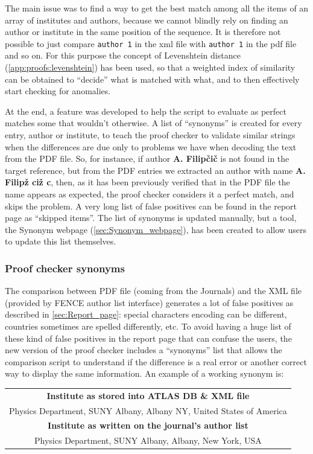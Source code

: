 The main issue was to find a way to get the best match among all the items of an array of institutes and authors,
because we cannot blindly rely on finding an author or institute in the same position of the sequence.
It is therefore not possible to just compare \texttt{author~1} in the xml file with \texttt{author~1} in the pdf file and so on.
For this purpose the concept of Levenshtein distance (\cref{app:proofs:levenshtein}) has been used,
so that a weighted index of similarity can be obtained to \enquote{decide} what is matched with what, and to then effectively start checking for anomalies.

At the end, a feature was developed to help the script to evaluate as perfect matches some that wouldn’t otherwise.
A list of \enquote{synonyms} is created for every entry, author or institute,
to teach the proof checker to validate similar strings when the differences are due only to problems we have when decoding the text from the PDF file.
So, for instance, if author \textbf{A. Filipčič} is not found in the target reference,
but from the PDF entries we extracted an author with name \textbf{A. Filipž ciž c}, then,
as it has been previously verified that in the PDF file the name appears as expected, the proof checker considers it a perfect match, and skips the problem.
A very long list of false positives can be found in the report page as \enquote{skipped items}.
The list of synonyms is updated manually, but a tool, the Synonym webpage (\cref{sec:Synonym_webpage}), has been created to allow users to update this list themselves.


\subsubsection{Proof checker synonyms}%
\label{sec:Proof_checker_synonyms}

The comparison between PDF file (coming from the Journals) and the XML file (provided by FENCE author list interface) generates a lot of false positives as described in \cref{sec:Report_page}:
special characters encoding can be different, countries sometimes are spelled differently, etc.
To avoid having a huge list of these kind of false positives in the report page that can confuse the users, the new version of the proof checker includes a \enquote{synonyms} list that allows the comparison script to understand if the difference is a real error or another correct way to display the same information.
An example of a working synonym is:
\begin{table}[htb]
  \centering
  \begin{tabular}{c}
  \textbf{Institute as stored into ATLAS DB \& XML file} \\
  Physics Department, SUNY Albany, Albany NY, United States of America \\
  \midrule
  \textbf{Institute as written on the journal’s author list} \\
  Physics Department, SUNY Albany, Albany, New York, USA
  \end{tabular}
\end{table}

